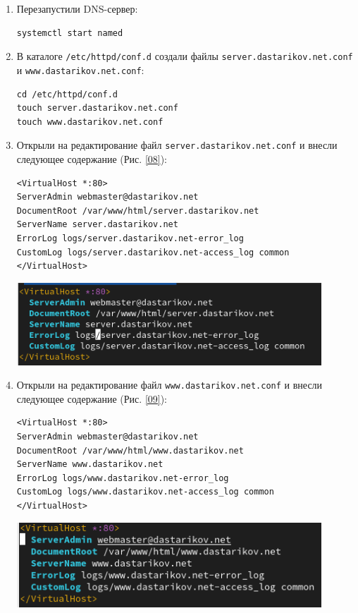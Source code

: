 \begin{enumerate}
\item Перезапустили DNS-сервер:
\begin{verbatim}
systemctl start named
\end{verbatim}
\item В каталоге \texttt{/etc/httpd/conf.d} создали файлы \texttt{server.dastarikov.net.conf} и \break \texttt{www.dastarikov.net.conf}:
\begin{verbatim}
cd /etc/httpd/conf.d
touch server.dastarikov.net.conf
touch www.dastarikov.net.conf
\end{verbatim}
\item Открыли на редактирование файл \texttt{server.dastarikov.net.conf} и внесли следующее содержание (Рис. \ref{08}):
\begin{verbatim}
<VirtualHost *:80>
ServerAdmin webmaster@dastarikov.net
DocumentRoot /var/www/html/server.dastarikov.net
ServerName server.dastarikov.net
ErrorLog logs/server.dastarikov.net-error_log
CustomLog logs/server.dastarikov.net-access_log common
</VirtualHost>
\end{verbatim}

\begin{center}
    \centering
    \includegraphics[width=0.9\textwidth]{../images/image08.png}
    \label{08}
\end{center}

\item Открыли на редактирование файл {\tt www.dastarikov.net.conf} и внесли следующее содержание (Рис. \ref{09}):
\begin{verbatim}
<VirtualHost *:80>
ServerAdmin webmaster@dastarikov.net
DocumentRoot /var/www/html/www.dastarikov.net
ServerName www.dastarikov.net
ErrorLog logs/www.dastarikov.net-error_log
CustomLog logs/www.dastarikov.net-access_log common
</VirtualHost>
\end{verbatim}

\begin{center}
    \centering
    \includegraphics[width=0.9\textwidth]{../images/image09.png}
    \label{09}
\end{center}


\end{enumerate}
